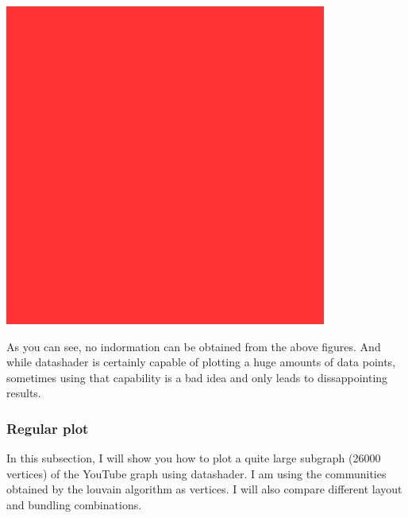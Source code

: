\documentclass[12pt, a4paper]{article}
\begin{document}
\begin{multicols}{2}
{\includegraphics[width=\columnwidth]{src/youtube/datashader/simple/fullgraph_full}\\
\label{fig:ds_fullgraph_full}}
\end{multicols}

As you can see, no indormation can be obtained from the above figures. And while datashader is certainly capable of plotting a huge amounts of data points, sometimes using that capability is a bad idea and only leads to dissappointing results.

\subsubsection{Regular plot}


In this subsection, I will show you how to plot a quite large subgraph (26000 vertices) of the YouTube graph using datashader. I am using the communities obtained by the louvain algorithm as vertices. I will also compare different layout and bundling combinations.

\end{document}

